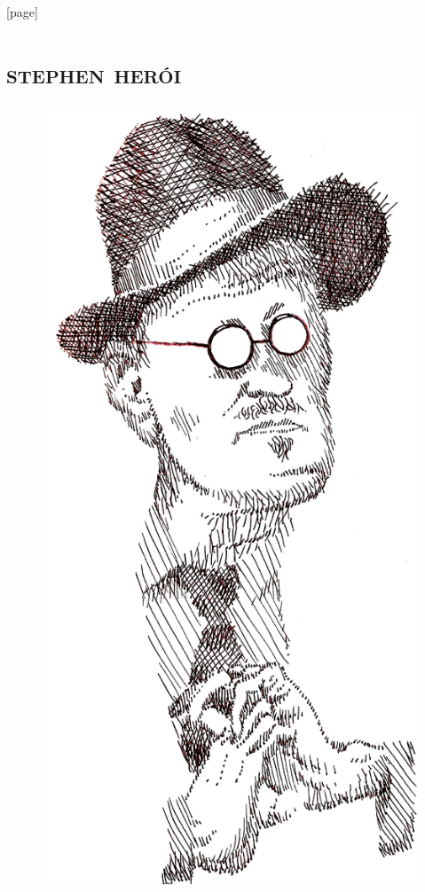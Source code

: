 
[page]
\renewcommand\footnote[2][\stepcounter{symbol}]{#1\NoCaseChange{\Footnote{{\normalsize\fnsymbol{symbol}}}{#2}}}


\makeatletter
\renewcommand\@endpart{\vfil\clearpage}
\makeatother

\part{\textsc{stephen herói}}

\begin{figure}[c]
\begin{center}
\includegraphics[width=.6\textwidth]{joyce4.jpg}
\end{center}
\end{figure}

\clearpage


\chapter*{\ } 

